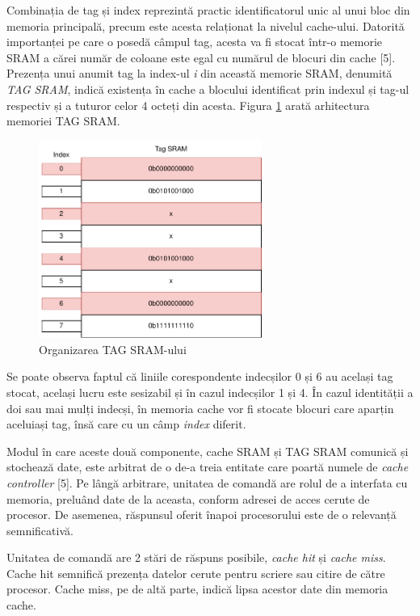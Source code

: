 \documentclass[12pt]{article}
\begin{document}
Combinația de tag și index reprezintă practic identificatorul unic al unui bloc din memoria principală, precum este acesta relaționat la nivelul cache-ului. Datorită importanței pe care o posedă câmpul tag, acesta va fi stocat într-o memorie SRAM a cărei număr de coloane este egal cu numărul de blocuri din cache [5]. Prezența unui anumit tag la index-ul \textit{i} din această memorie SRAM, denumită \textit{TAG SRAM}, indică existența în cache a blocului identificat prin indexul și tag-ul respectiv și a tuturor celor 4 octeți din acesta. Figura \ref{Figura:43} arată arhitectura memoriei TAG SRAM.

 \begin{figure}[h!]
 \includegraphics[width=0.65\textwidth]{tagsram.pdf}
 \centering
 \caption{Organizarea TAG SRAM-ului}
 \label{Figura:43}
 \end{figure}
 
 Se poate observa faptul că liniile corespondente indecșilor 0 și 6 au același tag stocat, același lucru este sesizabil și în cazul indecșilor 1 și 4. În cazul identității a doi sau mai mulți indecși, în memoria cache vor fi stocate blocuri care aparțin aceluiași tag, însă care cu un câmp \textit{index} diferit.

Modul în care aceste două componente, cache SRAM și TAG SRAM comunică și stochează date, este arbitrat de o de-a treia entitate care poartă numele de  \textit{cache controller} [5]. Pe lângă arbitrare, unitatea de comandă are rolul de a interfata cu memoria, preluând date de la aceasta, conform adresei de acces cerute de procesor. De asemenea, răspunsul oferit înapoi procesorului este de o relevanță semnificativă.

 Unitatea de comandă are 2 stări de răspuns posibile,  \textit{cache hit} și  \textit{cache miss}. Cache hit semnifică prezența datelor cerute pentru scriere sau citire de către procesor. Cache miss, pe de altă parte, indică lipsa acestor date din memoria cache.
 
\end{document}
